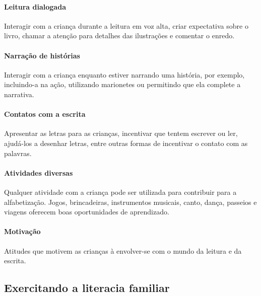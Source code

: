 \documentclass[11pt]{extarticle}
\begin{document}
\paragraph{Leitura dialogada} Interagir com a criança durante a leitura 
em voz alta, criar expectativa sobre o livro, chamar a atenção para detalhes 
das ilustrações e comentar o enredo.

\paragraph{Narração de histórias} Interagir com a criança enquanto 
estiver narrando uma história, por exemplo, incluindo-a na ação, utilizando 
marionetes ou permitindo que ela complete a narrativa.

\paragraph{Contatos com a escrita} Apresentar as letras para as 
crianças, incentivar que tentem escrever ou ler, ajudá-los a desenhar letras, 
entre outras formas de incentivar o contato com as palavras.

\paragraph{Atividades diversas} Qualquer atividade com a criança 
pode ser utilizada para contribuir para a alfabetização. Jogos, brincadeiras, 
instrumentos musicais, canto, dança, passeios e viagens oferecem boas 
oportunidades de aprendizado.

\paragraph{Motivação} Atitudes que motivem as crianças à envolver-se com 
o mundo da leitura e da escrita.

\subsection{Exercitando a literacia familiar}

\end{document}
